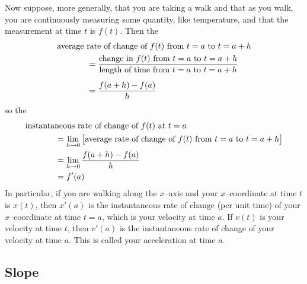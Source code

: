 Now suppose, more generally, that you are taking a walk and that
as you walk, you are continuously measuring some quantity, like temperature,
and that the measurement at time $t$ is $f(t)$. Then the
\begin{align*}
&\text{average rate of change of $f(t)$ from $t=a$ to $t=a+h$} \\
&\hskip0.5in=\frac{\text{change in $f(t)$ from $t=a$ to $t=a+h$}}
       {\text{length of time from $t=a$ to $t=a+h$}} \\[5pt]
&\hskip0.5in=\frac{f(a+h)-f(a)}{h}
\end{align*}
so the
\begin{align*}
&\text{instantaneous rate of change of $f(t)$ at $t=a$} \\
&\hskip0.5in=\lim_{h\rightarrow 0}
\big[\text{average rate of change of $f(t)$ from $t=a$ to $t=a+h$}\big]\\
&\hskip0.5in=\lim_{h\rightarrow 0}\frac{f(a+h)-f(a)}{h} \\
&\hskip0.5in= f'(a)
\end{align*}
In particular, if you are walking along the $x$--axis and your $x$--coordinate
at time $t$ is $x(t)$, then $x'(a)$ is the instantaneous rate of change
(per unit time) of your $x$--coordinate at time $t=a$, which is
your velocity at time $a$. If $v(t)$ is your velocity at time $t$, then
$v'(a)$ is the instantaneous rate of change of your velocity at time
$a$. This is called your acceleration at time $a$.

\subsection*{Slope}

